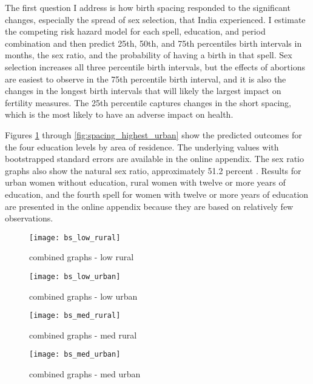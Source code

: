 \documentclass[12pt,letterpaper]{article}
\begin{document}
The first question I address is how birth spacing responded to the significant changes, 
especially the spread of sex selection, that India experienced. 
I estimate the competing risk hazard model for each spell, education, and period 
combination and then predict 25th, 50th, and 75th percentiles birth intervals in 
months, the sex ratio, and the probability of having a birth in that spell.
Sex selection increases all three percentile birth intervals, but the effects of abortions 
are easiest to observe in the 75th percentile birth interval, 
and it is also the changes in the longest birth intervals that will likely the largest 
impact on fertility measures.
The 25th percentile captures changes in the short spacing, which is the most likely to 
have an adverse impact on health.

Figures \ref{fig:spacing_low_rural} through \ref{fig:spacing_highest_urban}
show the predicted outcomes for the four education levels by area of residence.
The underlying values with bootstrapped standard errors are available in the online 
appendix.
The sex ratio graphs also show the natural sex ratio, approximately 51.2 percent 
\citep{ben-porath76b,jacobsen99,Portner2015b}.
Results for urban women without education, rural women with twelve or more years of 
education, and the fourth spell for women with twelve or more years of education are
presented in the online appendix because they are based on relatively few observations.

\begin{figure}
\centering
\texttt{[image: bs\_low\_rural]}
\caption{combined graphs - low rural}
\label{fig:spacing_low_rural}
\end{figure}

\begin{figure}
\centering
\texttt{[image: bs\_low\_urban]}
\caption{combined graphs - low urban}
\label{fig:spacing_low_urban}
\end{figure}

\begin{figure}
\centering
\texttt{[image: bs\_med\_rural]}
\caption{combined graphs - med rural}
\label{fig:spacing_med_rural}
\end{figure}

\begin{figure}
\centering
\texttt{[image: bs\_med\_urban]}
\caption{combined graphs - med urban}
\label{fig:spacing_med_urban}
\end{figure}
\end{document}

